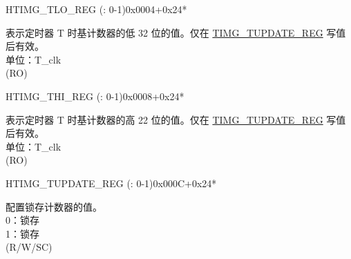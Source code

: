 \begin{register}{H}{TIMG\_TLO\_REG (: 0-1)}{0x0004+0x24*}\label{regdesc:TIMGTXLOREG}
%
\regnewline%
\begin{regdesc}\begin{reglist}
\label{fielddesc:TIMGTXLO}\item [TIMG\_T\regindex{x}\_LO] 表示定时器 T 时基计数器的低 32 位的值。仅在 \hyperref[regdesc:TIMGTXUPDATEREG]{TIMG\_TUPDATE\_REG} 写值后有效。\\
单位：T\_clk \\
(RO)
\end{reglist}\end{regdesc}
\end{register}


\begin{register}{H}{TIMG\_THI\_REG (: 0-1)}{0x0008+0x24*}\label{regdesc:TIMGTXHIREG}
%
%
\regnewline%
\begin{regdesc}\begin{reglist}
\label{fielddesc:TIMGTXHI}\item [TIMG\_T\regindex{x}\_HI] 表示定时器 T 时基计数器的高 22 位的值。仅在 \hyperref[regdesc:TIMGTXUPDATEREG]{TIMG\_TUPDATE\_REG} 写值后有效。\\
单位：T\_clk \\
(RO)
\end{reglist}\end{regdesc}
\end{register}


\begin{register}{H}{TIMG\_TUPDATE\_REG (: 0-1)}{0x000C+0x24*}\label{regdesc:TIMGTXUPDATEREG}
%
%
\regnewline%
\begin{regdesc}\begin{reglist}
\label{fielddesc:TIMGTXUPDATE}\item [TIMG\_T\regindex{x}\_UPDATE] 配置锁存计数器的值。\\
0：锁存 \\
1：锁存 \\
(R/W/SC)
\end{reglist}\end{regdesc}
\end{register}


